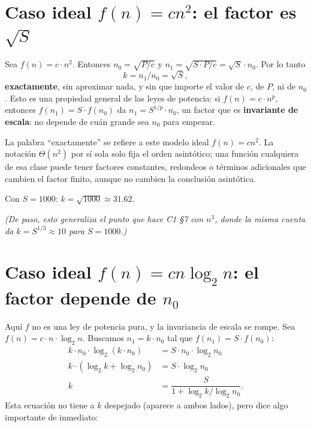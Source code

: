 \documentclass[11pt]{article}
\begin{document}
\section{Caso ideal \texorpdfstring{$f(n)=c n^2$}{f(n)=c n²}: el factor es \texorpdfstring{$\sqrt{S}$}{√S}}

Sea $f(n)=c\cdot n^2$. Entonces $n_0=\sqrt{P/c}$ y $n_1=\sqrt{S\cdot P/c}=\sqrt{S}\cdot n_0$. Por lo tanto
\[ k = n_1/n_0 = \sqrt{S}, \]
\textbf{exactamente}, sin aproximar nada, y sin que importe el valor de $c$, de $P$, ni de $n_0$. Esto es
una propiedad general de las leyes de potencia: si $f(n)=c\cdot n^p$, entonces $f(n_1)=S\cdot f(n_0)$ da
$n_1=S^{1/p}\cdot n_0$, un factor que es \textbf{invariante de escala}: no depende de cuán grande sea
$n_0$ para empezar.

La palabra ``exactamente'' se refiere a este modelo ideal $f(n)=c n^2$. La notación $\Theta(n^2)$ por
sí sola solo fija el orden asintótico; una función cualquiera de esa clase puede tener factores constantes,
redondeos o términos adicionales que cambien el factor finito, aunque no cambien la conclusión asintótica.

Con $S=1000$: $k=\sqrt{1000}\approx 31.62$.

\emph{(De paso, esto generaliza el punto que hace C1 §7 con $n^3$, donde la misma cuenta da
$k=S^{1/3}\approx 10$ para $S=1000$.)}

\section{Caso ideal \texorpdfstring{$f(n)=c n\log_2 n$}{f(n)=c n log n}: el factor depende de \texorpdfstring{$n_0$}{n0}}

Aquí $f$ no es una ley de potencia pura, y la invariancia de escala se rompe. Sea
$f(n)=c\cdot n\cdot\log_2 n$. Buscamos $n_1=k\cdot n_0$ tal que $f(n_1)=S\cdot f(n_0)$:
\begin{align*}
k\cdot n_0\cdot\log_2(k\cdot n_0) &= S\cdot n_0\cdot\log_2 n_0\\
k\cdot(\log_2 k+\log_2 n_0) &= S\cdot\log_2 n_0\\
k &= \dfrac{S}{1+\log_2 k/\log_2 n_0}.
\end{align*}
Esta ecuación no tiene a $k$ despejado (aparece a ambos lados), pero dice algo importante de inmediato:
\end{document}

